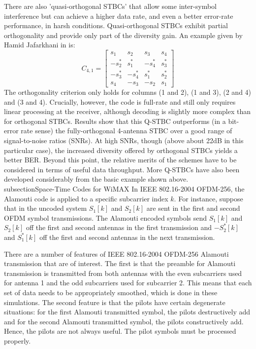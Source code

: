 There are also 'quasi-orthogonal STBCs' that allow some inter-symbol
interference but can achieve a higher data rate, and even a better
error-rate performance, in harsh conditions. Quasi-orthogonal STBCs
exhibit partial orthogonality and provide only part of the diversity
gain. An example given by Hamid Jafarkhani in \cite{20} is:
\[
C_{4,1}=\left[\begin{array}{cccc}
s_1 & s_2 & s_3 & s_4\\
-s^*_2 & s^*_1 & -s^*_4 & s^*_3\\
-s^*_3 & -s^*_4 & s^*_1 & s^*_2\\
s_4 & -s_3 & -s_2 & s_1
\end{array} \right]
\]
The orthogonality criterion only holds for columns (1 and 2), (1 and
3), (2 and 4) and (3 and 4). Crucially, however, the code is
full-rate and still only requires linear processing at the receiver,
although decoding is slightly more complex than for orthogonal
STBCs. Results show that this Q-STBC outperforms (in a bit-error
rate sense) the fully-orthogonal 4-antenna STBC over a good range of
signal-to-noise ratios (SNRs). At high SNRs, though (above about
22dB in this particular case), the increased diversity offered by
orthogonal STBCs yields a better BER. Beyond this point, the
relative merits of the schemes have to be considered in terms of
useful data throughput. More Q-STBCs have also been developed
considerably from the basic example shown above.
\\subsection{Space-Time Codes for WiMAX}
In IEEE 802.16-2004 OFDM-256, the Alamouti code is applied to a
specific subcarrier index $k$. For instance, suppose that in the
uncoded system $S_1[k]$ and $S_2[k]$ are sent in the first and
second OFDM symbol transmissions.  The Alamouti encoded symbols send
$S_1[k]$ and $S_2[k]$ off the first and second antennas in the first
transmission and $-S_2^*[k]$ and $S_1^*[k]$ off the first and second
antennas in the next transmission.

There are a number of features of IEEE 802.16-2004 OFDM-256 Alamouti
transmission that are of interest.  The first is that the preamble
for Alamouti transmission is transmitted from both antennas with the
even subcarriers used for antenna 1 and the odd subcarriers used for
subcarrier 2. This means that each set of data needs to be
appropriately smoothed, which is done in these simulations. The
second feature is that the pilots have certain degenerate
situations: for the first Alamouti transmitted symbol, the pilots
destructively add and for the second Alamouti transmitted symbol,
the pilots constructively add. Hence, the pilots are not always
useful. The pilot symbols must be processed properly.

